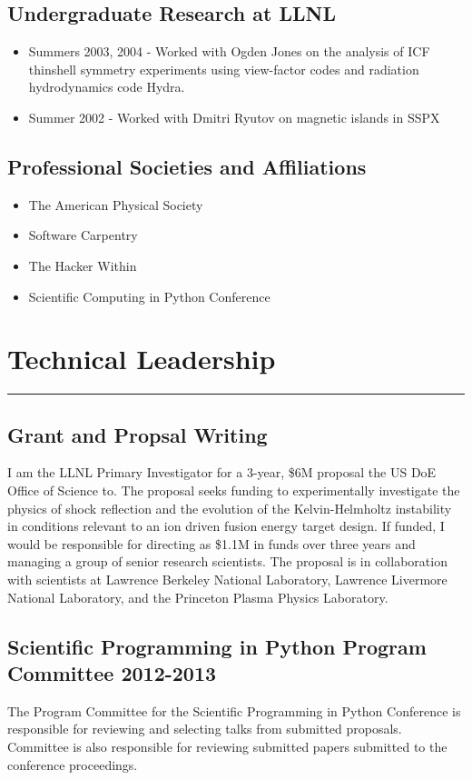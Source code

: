 \documentclass[letterpaper,11pt]{article}
\begin{document}
\subsection*{Undergraduate Research at LLNL}
\begin{itemize}
	\item Summers 2003, 2004 - Worked with Ogden Jones on the analysis of ICF thinshell symmetry experiments using view-factor codes and radiation hydrodynamics code Hydra.
	\item Summer 2002 -  Worked with Dmitri Ryutov on magnetic islands in SSPX
\end{itemize}

\subsection*{Professional Societies and Affiliations}
\begin{itemize}
	\item The American Physical Society
	\item Software Carpentry
	\item The Hacker Within
	\item Scientific Computing in Python Conference
\end{itemize}

\pagebreak

\section*{Technical Leadership}
\hrule
\vspace{0.05in}
\subsection*{Grant and Propsal Writing}
I am the LLNL Primary Investigator for a 3-year, \$6M proposal the US DoE
Office of Science to.  The proposal seeks funding to  experimentally investigate
the physics of shock reflection and the evolution of the Kelvin-Helmholtz
instability in conditions relevant to an ion driven fusion energy target
design.  If funded, I would be responsible for directing as \$1.1M in funds
over three years and managing a group of senior research scientists.  The
proposal is in collaboration with scientists at Lawrence Berkeley National
Laboratory, Lawrence Livermore National Laboratory, and the Princeton Plasma
Physics Laboratory.

\subsection*{Scientific Programming in Python Program Committee 2012-2013}
The Program Committee for the Scientific Programming in Python Conference is
responsible for reviewing and selecting talks from submitted proposals.
Committee is also responsible for reviewing submitted papers submitted to the
conference proceedings.
\end{document}
